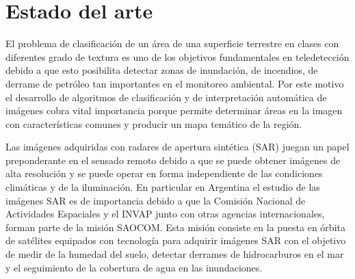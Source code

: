 \documentclass[11pt]{article}
\begin{document}
\section{Estado del arte}

El problema de clasificación de un área de una superficie terrestre en clases con diferentes grado de textura es uno de los objetivos fundamentales en teledetección debido a que esto posibilita detectar zonas de inundación, de incendios, de derrame de petróleo tan importantes en el monitoreo ambiental. Por este motivo el desarrollo de algoritmos de clasificación y de interpretación automática de imágenes cobra vital importancia  porque permite determinar áreas en la imagen con características comunes  y producir un mapa temático de la región. 



Las imágenes adquiridas con radares de apertura sintética (SAR) juegan un papel preponderante en el sensado remoto debido a que se puede obtener imágenes de alta resolución y se puede operar en forma independiente de las condiciones climáticas y de la iluminación. En particular en Argentina el estudio de las imágenes SAR es de importancia debido a que la Comisión Nacional de Actividades Espaciales y el INVAP junto con otras agencias internacionales, forman parte de la misión SAOCOM. Esta misión consiste en la puesta en órbita de satélites equipados con tecnología para adquirir imágenes SAR con el objetivo de medir de la humedad del suelo, detectar derrames de hidrocarburos en el mar y el seguimiento de la cobertura de agua en las inundaciones. 
\end{document}
